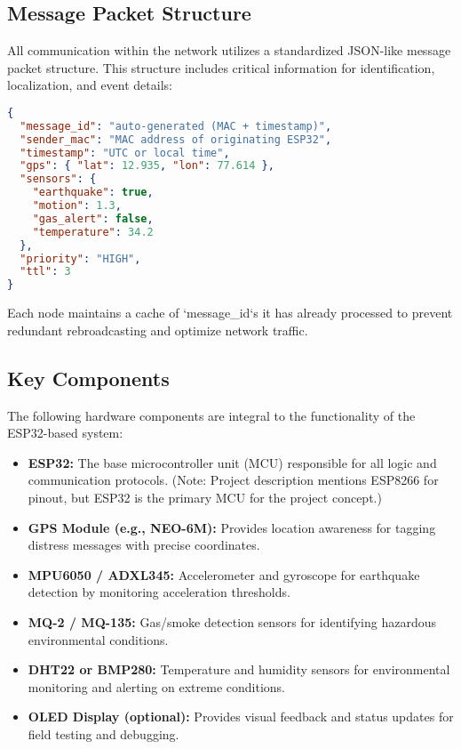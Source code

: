 \documentclass[12pt, a4paper]{article}
\begin{document}
\subsection{Message Packet Structure}
All communication within the network utilizes a standardized JSON-like message packet structure. This structure includes critical information for identification, localization, and event details:
\begin{lstlisting}[language=json, caption=SOS Message Packet Structure]
{
  "message_id": "auto-generated (MAC + timestamp)",
  "sender_mac": "MAC address of originating ESP32",
  "timestamp": "UTC or local time",
  "gps": { "lat": 12.935, "lon": 77.614 },
  "sensors": {
    "earthquake": true,
    "motion": 1.3,
    "gas_alert": false,
    "temperature": 34.2
  },
  "priority": "HIGH",
  "ttl": 3
}
\end{lstlisting}
Each node maintains a cache of `message_id`s it has already processed to prevent redundant rebroadcasting and optimize network traffic.

\subsection{Key Components}
The following hardware components are integral to the functionality of the ESP32-based system:
\begin{itemize}
    \item \textbf{ESP32:} The base microcontroller unit (MCU) responsible for all logic and communication protocols. (Note: Project description mentions ESP8266 for pinout, but ESP32 is the primary MCU for the project concept.)
    \item \textbf{GPS Module (e.g., NEO-6M):} Provides location awareness for tagging distress messages with precise coordinates.
    \item \textbf{MPU6050 / ADXL345:} Accelerometer and gyroscope for earthquake detection by monitoring acceleration thresholds.
    \item \textbf{MQ-2 / MQ-135:} Gas/smoke detection sensors for identifying hazardous environmental conditions.
    \item \textbf{DHT22 or BMP280:} Temperature and humidity sensors for environmental monitoring and alerting on extreme conditions.
    \item \textbf{OLED Display (optional):} Provides visual feedback and status updates for field testing and debugging.
\end{itemize}
\end{document}
